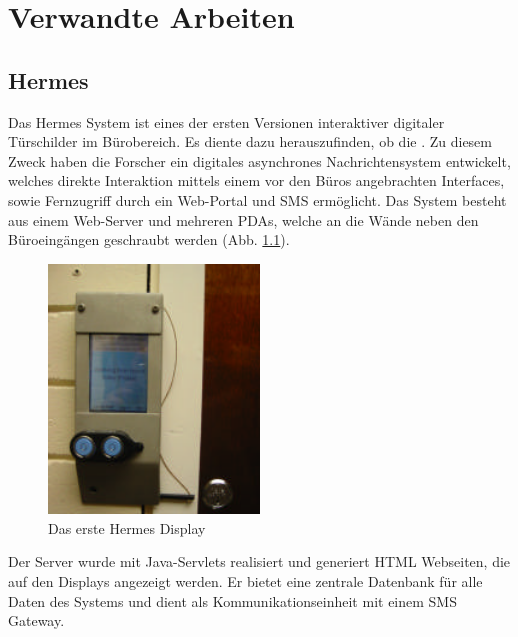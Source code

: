 \chapter{Verwandte Arbeiten}
\section{Hermes}
Das Hermes System\cite{cheverest:2003:paper}\cite{cheverest:2003:article}\cite{cheveres:2005:hermes-bluetooth}\cite{cheverest:2012} ist eines der ersten Versionen interaktiver digitaler Türschilder im Bürobereich.
Es diente dazu herauszufinden, ob die \cite{cheverest:2003:paper}\cite{cheverest:2003:article}.
Zu diesem Zweck haben die Forscher ein digitales asynchrones Nachrichtensystem entwickelt, welches direkte Interaktion mittels einem vor den Büros angebrachten Interfaces, sowie Fernzugriff durch ein Web-Portal und SMS ermöglicht.
Das System besteht aus einem Web-Server und mehreren PDAs, welche an die Wände neben den Büroeingängen geschraubt werden (Abb. \ref{img:hermesDisplay}).
\begin{figure}[h!]
  \centering
    \includegraphics[width=0.5\textwidth]{./img/hermes_display.png}
  \caption{Das erste Hermes Display\cite{cheverest:2003:paper}}
  \label{img:hermesDisplay} %
\end{figure}
Der Server wurde mit Java-Servlets realisiert und generiert HTML Webseiten, die auf den Displays angezeigt werden. Er bietet eine zentrale Datenbank für alle Daten des Systems und dient als Kommunikationseinheit mit einem SMS Gateway.
